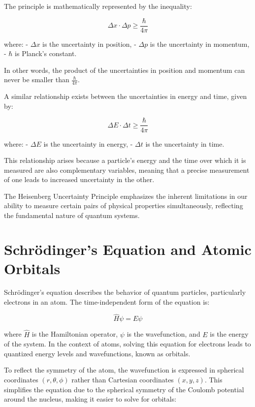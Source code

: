 \documentclass{report}
\begin{document}
The principle is mathematically represented by the inequality:

\[
	\boxed{\Delta x \cdot \Delta p \geq \frac{\hbar}{4 \pi}}
\]

where:
- \(\Delta x\) is the uncertainty in position,
- \(\Delta p\) is the uncertainty in momentum,
- \(\hbar\) is  Planck's constant.

In other words, the product of the uncertainties in position and momentum can never be smaller than \(\frac{\hbar}{4 \pi}\).

A similar relationship exists between the uncertainties in energy and time, given by:

\[
	\boxed{\Delta E \cdot \Delta t \geq \frac{\hbar}{4 \pi}}
\]

where:
- \(\Delta E\) is the uncertainty in energy,
- \(\Delta t\) is the uncertainty in time.

This relationship arises because a particle's energy and the time over which it is measured are also complementary variables, meaning that a precise measurement of one leads to increased uncertainty in the other.

The Heisenberg Uncertainty Principle emphasizes the inherent limitations in our ability to measure certain pairs of physical properties simultaneously, reflecting the fundamental nature of quantum systems.


\section{Schrödinger's Equation and Atomic Orbitals}

Schrödinger's equation describes the behavior of quantum particles, particularly electrons in an atom. The time-independent form of the equation is:

\begin{equation}
	\hat{H}\psi = E\psi
\end{equation}

where $\hat{H}$ is the Hamiltonian operator, $\psi$ is the wavefunction, and $E$ is the energy of the system. In the context of atoms, solving this equation for electrons leads to quantized energy levels and wavefunctions, known as orbitals.

To reflect the symmetry of the atom, the wavefunction is expressed in spherical coordinates $(r, \theta, \phi)$ rather than Cartesian coordinates $(x, y, z)$. This simplifies the equation due to the spherical symmetry of the Coulomb potential around the nucleus, making it easier to solve for orbitals:
\end{document}
